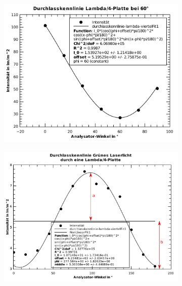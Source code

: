 \begin{figure}[H]
\begin{subfigure}{.45\linewidth}
        \includegraphics[width=\linewidth]{images/aufgabe-5_60grad.pdf}
        \caption{}
    \end{subfigure}
    \begin{subfigure}{.45\linewdith}
        \includegraphics[width=\linewidth]{images/aufgabe-6.pdf}
        \caption{}
    \end{subfigure}
\end{figure}


